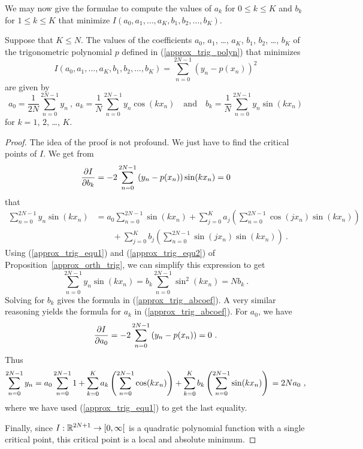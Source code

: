 We may now give the formulae to compute the values of $a_k$ for
$0\leq k \leq K$ and $b_k$ for $1 \leq k \leq K$
that minimize $I(a_0,a_1,\ldots,a_K,b_1,b_2,\ldots,b_K)$.

\begin{theorem}
Suppose that $K\leq N$.  The values of the coefficients $a_0$, $a_1$, \ldots,
$a_K$, $b_1$, $b_2$, \ldots, $b_K$ of the trigonometric polynomial $p$
defined in (\ref{approx_trig_polyn}) that minimizes
\[
I(a_0,a_1,\ldots,a_K,b_1,b_2,\ldots,b_K) =
\sum_{n=0}^{2N-1} \left( y_n - p(x_n) \right)^2
\]
are given by
\begin{equation} \label{approx_trig_abcoef}
a_0 = \frac{1}{2N}\sum_{n=0}^{2N-1} y_n \ ,
\ a_k = \frac{1}{N}\sum_{n=0}^{2N-1} y_n \cos(k x_n)
\quad \text{and}
\quad b_k = \frac{1}{N}\sum_{n=0}^{2N-1} y_n \sin(k x_n) 
\end{equation}
for $k=1$, $2$, \ldots, $K$.
\label{approx_coeff_real_trig}
\end{theorem}

\begin{proof}
The idea of the proof is not profound.  We just have to find the critical
points of $I$.  We get from
\[
\frac{\partial{I}}{\partial{b_k}} = - 2 \sum_{n=0}^{2N-1} \left( y_n - p(x_n) \right)\sin(k x_n)
= 0
\]
that
\begin{align*}
\sum_{n=0}^{2N-1} y_n \sin(k x_n)
& = a_0 \sum_{n=0}^{2N-1} \sin(k x_n)
+ \sum_{j=0}^K a_j \left( \sum_{n=0}^{2N-1} \cos(j x_n) \sin(k x_n) \right) \\
&\qquad
+ \sum_{j=0}^K b_j \left( \sum_{n=0}^{2N-1} \sin(j x_n) \sin(k x_n) \right) \ .
\end{align*}
Using (\ref{approx_trig_equ1}) and (\ref{approx_trig_equ2})
of Proposition~\ref{approx_orth_trig}, we can simplify this expression to get
\[
\sum_{n=0}^{2N-1} y_n \sin(k x_n) = b_k \sum_{n=0}^{2N-1} \sin^2(k x_n) = N
b_k \ .
\]
Solving for $b_k$ gives the formula in (\ref{approx_trig_abcoef}).
A very similar reasoning yields the formula for $a_k$ in
(\ref{approx_trig_abcoef}).  For $a_0$, we have
\[
\frac{\partial{I}}{\partial{a_0}} = -2\sum_{n=0}^{2N-1} \left( y_n - p(x_n) \right) = 0 \ .
\]
Thus
\[
\sum_{n=0}^{2N-1} y_n = a_0 \sum_{n=0}^{2N-1} 1
+ \sum_{k=0}^K a_k \left( \sum_{n=0}^{2N-1} \cos(k x_n) \right)
+ \sum_{k=0}^K b_k \left( \sum_{n=0}^{2N-1} \sin(k x_n) \right) \\
= 2 N a_0 \ ,
\]
where we have used (\ref{approx_trig_equ1}) to get the last equality.

Finally, since $\displaystyle I:\mathbb{R}^{2N+1} \rightarrow [0,\infty[$ is a
quadratic polynomial function with a single critical point, this
critical point is a local and absolute minimum.
\end{proof}

